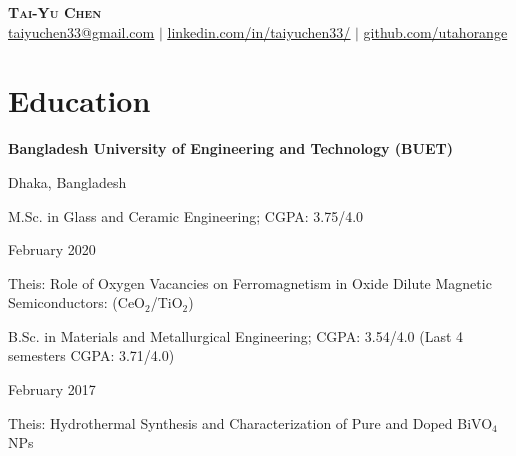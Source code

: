 \documentclass[letterpaper,20pt]{article}
\begin{document}
\begin{center}
    \textbf{\Huge \scshape Tai-Yu Chen} \\ \vspace{1pt}
    \href{mailto:taiyuchen33@gmail.com}{\underline{taiyuchen33@gmail.com}} $|$ 
    \href{https://www.linkedin.com/in/taiyuchen33/}{\underline{linkedin.com/in/taiyuchen33/}} $|$
    \href{https://github.com/utahorange}{\underline{github.com/utahorange}}
\end{center}



\section{Education}
    \begin{minipage}{.75\linewidth} \begin{flushleft}
    		\textbf{Bangladesh University of Engineering and Technology (BUET)}
    	\end{flushleft} \end{minipage}
    \hfill 
    \begin{minipage}{.20\linewidth}\begin{flushright}
    	 Dhaka, Bangladesh
    	\end{flushright}\end{minipage}
    	
    	\begin{minipage}{.75\linewidth} \begin{flushleft}
    		M.Sc. in Glass and Ceramic Engineering;  CGPA: 3.75/4.0\\
    	\end{flushleft} \end{minipage}
    \hfill 
    \begin{minipage}{.20\linewidth}\begin{flushright}
    	 February 2020
    	\end{flushright}\end{minipage} 
	 Theis: Role of Oxygen Vacancies on Ferromagnetism in Oxide Dilute Magnetic Semiconductors: (CeO$_2$/TiO$_{2}$)\\
	
   		\begin{minipage}{.85\linewidth} \begin{flushleft}
    		B.Sc. in Materials and Metallurgical Engineering;  CGPA: 3.54/4.0 (Last 4 semesters CGPA: 3.71/4.0)\\
    	\end{flushleft} \end{minipage}
    \hfill 
    \begin{minipage}{.13\linewidth}\begin{flushright}
    	 February 2017
    	\end{flushright}\end{minipage}
	 Theis: Hydrothermal Synthesis and Characterization of Pure and Doped BiVO$_{4}$ NPs\\
	 \vspace{2pt}
	  
\end{document}
